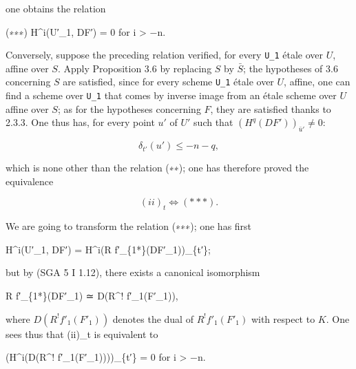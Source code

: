 \documentclass[
]{article}
\newenvironment{Shaded}{}{}
\newcommand{\NormalTok}[1]{#1}
\begin{document}
one obtains the relation

\begin{Shaded}
\begin{Highlighting}[]
\NormalTok{(∗∗∗) H\^{}i(U′\_1, DF′) = 0 for i \textgreater{} −n.}
\end{Highlighting}
\end{Shaded}

Conversely, suppose the preceding relation verified, for every
\texttt{U\_1} étale over \(U\), affine over \(S\). Apply Proposition 3.6
by replacing \(S\) by \(\bar{S}\); the hypotheses of 3.6 concerning
\(S\) are satisfied, since for every scheme \texttt{U\_1} étale over
\(U\), affine, one can find a scheme over \texttt{U\_1} that comes by
inverse image from an étale scheme over \(U\) affine over \(S\); as for
the hypotheses concerning \(F\), they are satisfied thanks to 2.3.3. One
thus has, for every point \(u'\) of \(U'\) such that
\((H^{q}(DF'))_{\bar{u}'} \neq 0\):

\[
\delta_{t'}(u') \leqslant -n - q,
\]

which is none other than the relation (∗∗); one has therefore proved the
equivalence

\[
(ii)_{t} \Leftrightarrow (\ast\ast\ast).
\]

We are going to transform the relation (∗∗∗); one has first

\begin{Shaded}
\begin{Highlighting}[]
\NormalTok{H\^{}i(U′\_1, DF′) = H\^{}i(R f′\_\{1*\}(DF′\_1))\_\{t′\};}
\end{Highlighting}
\end{Shaded}

but by (SGA 5 I 1.12), there exists a canonical isomorphism

\begin{Shaded}
\begin{Highlighting}[]
\NormalTok{R f′\_\{1*\}(DF′\_1) ≃ D(R\^{}! f′\_1(F′\_1)),}
\end{Highlighting}
\end{Shaded}

where \(D(R^{!} f'_{1}(F'_{1}))\) denotes the dual of
\(R^{!} f'_{1}(F'_{1})\) with respect to \(K\). One sees thus that
(ii)\_t is equivalent to

\begin{Shaded}
\begin{Highlighting}[]
\NormalTok{(H\^{}i(D(R\^{}! f′\_1(F′\_1))))\_\{t′\} = 0 for i \textgreater{} −n.}
\end{Highlighting}
\end{Shaded}
\end{document}
